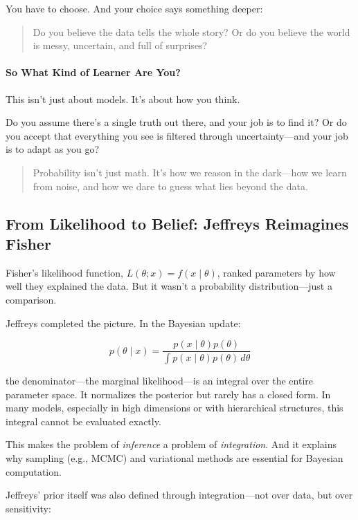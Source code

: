 You have to choose. And your choice says something deeper:

\begin{quote}
Do you believe the data tells the whole story?  
Or do you believe the world is messy, uncertain, and full of surprises?
\end{quote}

\paragraph{So What Kind of Learner Are You?}

This isn’t just about models. It’s about how you think.

Do you assume there’s a single truth out there, and your job is to find it?  
Or do you accept that everything you see is filtered through uncertainty—and your job is to adapt as you go?

\begin{quote}
Probability isn’t just math.  
It’s how we reason in the dark—how we learn from noise, and how we dare to guess what lies beyond the data.
\end{quote}






\subsection{From Likelihood to Belief: Jeffreys Reimagines Fisher}

Fisher’s likelihood function, \( L(\theta; x) = f(x \mid \theta) \), ranked parameters by how well they explained the data. But it wasn’t a probability distribution—just a comparison.

Jeffreys completed the picture. In the Bayesian update:

\[
p(\theta \mid x) = \frac{p(x \mid \theta)p(\theta)}{\int p(x \mid \theta)p(\theta)\, d\theta}
\]

the denominator—the marginal likelihood—is an integral over the entire parameter space. It normalizes the posterior but rarely has a closed form. In many models, especially in high dimensions or with hierarchical structures, this integral cannot be evaluated exactly.

This makes the problem of \emph{inference} a problem of \emph{integration}. And it explains why sampling (e.g., MCMC) and variational methods are essential for Bayesian computation.

Jeffreys’ prior itself was also defined through integration—not over data, but over sensitivity:

